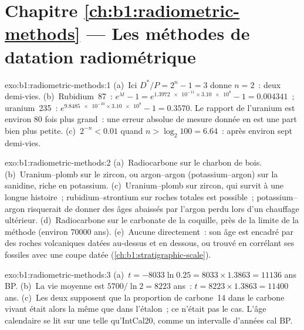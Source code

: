 \section*{Chapitre \ref{ch:b1:radiometric-methods} --- Les méthodes de datation radiométrique}

\begin{solution}{exo:b1:radiometric-methods:1}
(a)~Ici $D^*/P = 2^n - 1 = 3$ donne $n = 2$~: deux demi-vies. (b)~Rubidium~87~:
$e^{\lambda t} - 1 = e^{\num{1.3972e-11} \times \num{3.10e8}} - 1 = 0.004341$~;
uranium~235~: $e^{\num{9.8485e-10} \times \num{3.10e8}} - 1 = 0.3570$. Le
rapport de l'uranium est environ 80 fois plus grand~: une erreur absolue de mesure donnée en
est une part bien plus petite. (c)~$2^{-n} < 0.01$ quand $n > \log_2 100 = 6.64$~: après
environ sept demi-vies.
\end{solution}

\begin{solution}{exo:b1:radiometric-methods:2}
(a)~Radiocarbone sur le charbon de bois. (b)~Uranium--plomb sur le zircon, ou
argon--argon (potassium--argon) sur la sanidine,  riche en potassium.
(c)~Uranium--plomb sur zircon, qui survit à une longue histoire~; rubidium--strontium
sur roches totales est possible~; potassium--argon risquerait de donner des âges abaissés par l'argon
perdu lors d'un chauffage ultérieur. (d)~Radiocarbone sur le carbonate de la coquille, près de la
limite de la méthode (environ \num{70000} ans). (e)~Aucune directement~: son âge est
encadré par des roches volcaniques datées au-dessus et en dessous, ou trouvé en corrélant ses
fossiles avec une coupe datée (\cref{ch:b1:stratigraphic-scale}).
\end{solution}

\begin{solution}{exo:b1:radiometric-methods:3}
(a)~$t = -8033 \ln 0.25 = 8033 \times 1.3863 = \num{11136}$ ans BP.
(b)~La vie moyenne est $5700/\ln 2 = \num{8223}$ ans~: $t = 8223 \times 1.3863 =
\num{11400}$ ans. (c)~Les deux supposent que la proportion de carbone~14 dans le carbone vivant
était alors la même que dans l'étalon~; ce n'était pas le cas. L'âge calendaire se lit
sur une  telle qu'IntCal20, comme un intervalle d'années cal BP.
\end{solution}


